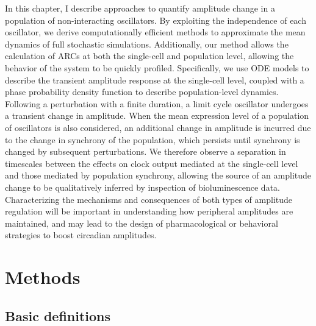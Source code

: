 In this chapter, I describe approaches to quantify amplitude change in a population of non-interacting oscillators.
By exploiting the independence of each oscillator, we derive computationally efficient methods to approximate the mean dynamics of full stochastic simulations.
Additionally, our method allows the calculation of ARCs at both the single-cell and population level, allowing the behavior of the system to be quickly profiled.
Specifically, we use ODE models to describe the transient amplitude response at the single-cell level, coupled with a phase probability density function to describe population-level dynamics.
Following a perturbation with a finite duration, a limit cycle oscillator undergoes a transient change in amplitude.
When the mean expression level of a population of oscillators is also considered, an additional change in amplitude is incurred due to the change in synchrony of the population, which persists until synchrony is changed by subsequent perturbations.
We therefore observe a separation in timescales between the effects on clock output mediated at the single-cell level and those mediated by population synchrony, allowing the source of an amplitude change to be qualitatively inferred by inspection of bioluminescence data.
Characterizing the mechanisms and consequences of both types of amplitude regulation will be important in understanding how peripheral amplitudes are maintained, and may lead to the design of pharmacological or behavioral strategies to boost circadian amplitudes.


\section{Methods}

\subsection{Basic definitions}

